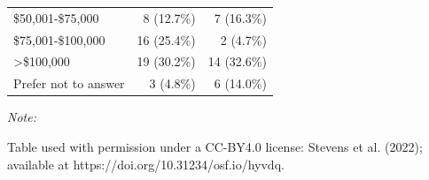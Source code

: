 \documentclass[
  doc]{apa6}
\begin{document}
\begin{table}[!h]
\begin{threeparttable}
\begin{tabular}[t]{lrr}
\hspace{1em}\$50,001-\$75,000 & 8 (12.7\%) & 7 (16.3\%)\\
\hspace{1em}\$75,001-\$100,000 & 16 (25.4\%) & 2 (4.7\%)\\
\hspace{1em}>\$100,000 & 19 (30.2\%) & 14 (32.6\%)\\
\hspace{1em}Prefer not to answer & 3 (4.8\%) & 6 (14.0\%)\\
\bottomrule
\end{tabular}
\begin{tablenotes}
\item \textit{Note: } 
\item Table used with permission under a CC-BY4.0 license: Stevens et al. (2022); available at https://doi.org/10.31234/osf.io/hyvdq.
\end{tablenotes}
\end{threeparttable}
\end{table}
\end{document}
